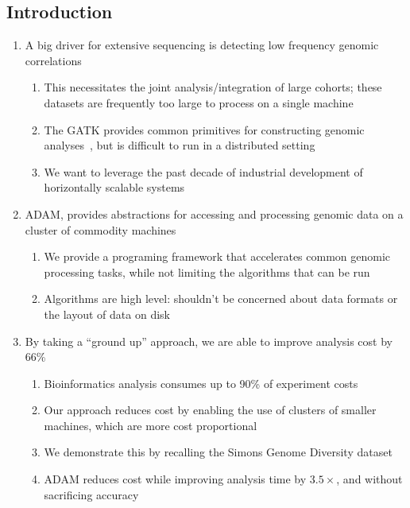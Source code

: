 \documentclass{nature}
\begin{document}
\begin{refsegment}
\section{Introduction}
\label{sec:introduction}

\begin{enumerate}
\item A big driver for extensive sequencing is detecting low frequency genomic correlations
\begin{enumerate}
\item This necessitates the joint analysis/integration of large cohorts; these datasets are
frequently too large to process on a single machine
\item The GATK provides common primitives for constructing genomic analyses~\cite{mckenna10}, but
is difficult to run in a distributed setting
\item We want to leverage the past decade of industrial development of horizontally scalable
systems~\cite{zaharia10, dean08}
\end{enumerate}
\item ADAM, provides abstractions for accessing and processing genomic data on a cluster
of commodity machines
\begin{enumerate}
\item We provide a programing framework that accelerates common genomic processing tasks, while
not limiting the algorithms that can be run
\item Algorithms are high level: shouldn't be concerned about data formats or the layout
of data on disk
\end{enumerate}
\item By taking a ``ground up'' approach, we are able to improve analysis cost by 66\%
\begin{enumerate}
\item Bioinformatics analysis consumes up to 90\% of experiment costs~\cite{andrews14}
\item Our approach reduces cost by enabling the use of clusters of smaller machines, which are
more cost proportional~\cite{janapa10}
\item We demonstrate this by recalling the Simons Genome Diversity dataset~\cite{prufer14}
\item ADAM reduces cost while improving analysis time by $3.5\times$, and without sacrificing
accuracy
\end{enumerate}
\end{enumerate}


\end{refsegment}
\end{document}
